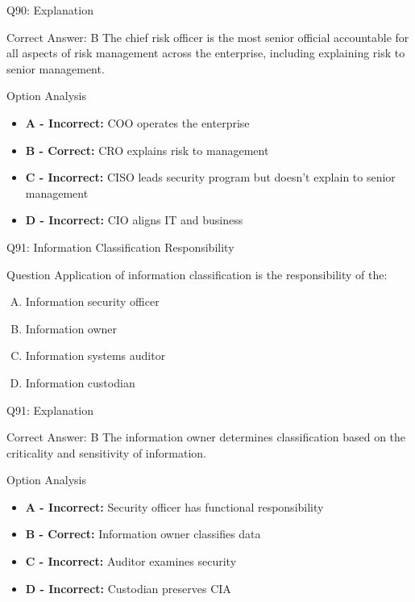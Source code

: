 \documentclass{beamer}
\begin{document}
	\begin{frame}{Q90: Explanation}
		\begin{block}{Correct Answer: B}
			The chief risk officer is the most senior official accountable for all aspects of risk management across the enterprise, including explaining risk to senior management.
		\end{block}
		\begin{block}{Option Analysis}
			\begin{itemize}
				\item \textbf{A - Incorrect:} COO operates the enterprise
				\item \textbf{B - Correct:} CRO explains risk to management
				\item \textbf{C - Incorrect:} CISO leads security program but doesn't explain to senior management
				\item \textbf{D - Incorrect:} CIO aligns IT and business
			\end{itemize}
		\end{block}
	\end{frame}
	
	\begin{frame}{Q91: Information Classification Responsibility}
		\begin{block}{Question}
			Application of information classification is the responsibility of the:
		\end{block}
		\begin{enumerate}[(A)]
			\item Information security officer
			\item Information owner
			\item Information systems auditor
			\item Information custodian
		\end{enumerate}
	\end{frame}
	
	\begin{frame}{Q91: Explanation}
		\begin{block}{Correct Answer: B}
			The information owner determines classification based on the criticality and sensitivity of information.
		\end{block}
		\begin{block}{Option Analysis}
			\begin{itemize}
				\item \textbf{A - Incorrect:} Security officer has functional responsibility
				\item \textbf{B - Correct:} Information owner classifies data
				\item \textbf{C - Incorrect:} Auditor examines security
				\item \textbf{D - Incorrect:} Custodian preserves CIA
			\end{itemize}
		\end{block}
	\end{frame}
	
\end{document}

